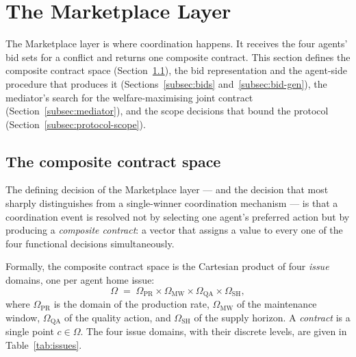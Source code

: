 \section{The Marketplace Layer}
\label{sec:arch-marketplace}

The Marketplace layer is where coordination happens. It receives the
four agents' bid sets for a conflict and returns one composite contract.
This section defines the composite contract space
(Section~\ref{subsec:contract-space}), the bid representation and the
agent-side procedure that produces it (Sections~\ref{subsec:bids}
and~\ref{subsec:bid-gen}), the mediator's search for the
welfare-maximising joint contract (Section~\ref{subsec:mediator}), and
the scope decisions that bound the protocol (Section~\ref{subsec:protocol-scope}).

\subsection{The composite contract space}
\label{subsec:contract-space}

The defining decision of the Marketplace layer --- and the decision
that most sharply distinguishes \NEXUS{} from a single-winner
coordination mechanism --- is that a coordination event is resolved not
by selecting one agent's preferred action but by producing a
\emph{composite contract}: a vector that assigns a value to every one of
the four functional decisions simultaneously.

Formally, the composite contract space is the Cartesian product of four
\emph{issue} domains, one per agent home issue:
%
\begin{equation}
  \label{eq:contract-space}
  \Omega \;=\; \Omega_{\mathrm{PR}} \times \Omega_{\mathrm{MW}}
            \times \Omega_{\mathrm{QA}} \times \Omega_{\mathrm{SH}},
\end{equation}
%
where $\Omega_{\mathrm{PR}}$ is the domain of the production rate,
$\Omega_{\mathrm{MW}}$ of the maintenance window, $\Omega_{\mathrm{QA}}$
of the quality action, and $\Omega_{\mathrm{SH}}$ of the supply horizon.
A \emph{contract} is a single point $c \in \Omega$. The four issue
domains, with their discrete levels, are given in
Table~\ref{tab:issues}.

